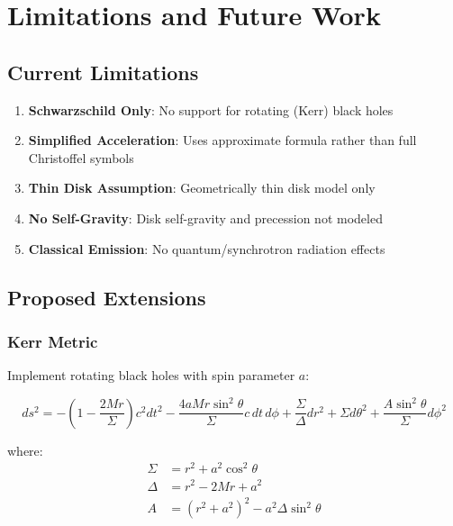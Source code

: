 \documentclass[12pt,a4paper]{article}
\theoremstyle{definition}
\theoremstyle{remark}
\begin{document}
\section{Limitations and Future Work}

\subsection{Current Limitations}

\begin{enumerate}
    \item \textbf{Schwarzschild Only}: No support for rotating (Kerr) black holes
    \item \textbf{Simplified Acceleration}: Uses approximate formula rather than full Christoffel symbols
    \item \textbf{Thin Disk Assumption}: Geometrically thin disk model only
    \item \textbf{No Self-Gravity}: Disk self-gravity and precession not modeled
    \item \textbf{Classical Emission}: No quantum/synchrotron radiation effects
\end{enumerate}

\subsection{Proposed Extensions}

\subsubsection{Kerr Metric}

Implement rotating black holes with spin parameter $a$:

\begin{equation}
    ds^2 = -\left(1 - \frac{2Mr}{\Sigma}\right)c^2dt^2 - \frac{4aMr\sin^2\theta}{\Sigma}c \, dt \, d\phi + \frac{\Sigma}{\Delta}dr^2 + \Sigma d\theta^2 + \frac{A\sin^2\theta}{\Sigma}d\phi^2
\end{equation}

where:
\begin{align}
    \Sigma &= r^2 + a^2\cos^2\theta \\
    \Delta &= r^2 - 2Mr + a^2 \\
    A &= (r^2 + a^2)^2 - a^2\Delta\sin^2\theta
\end{align}
\end{document}
